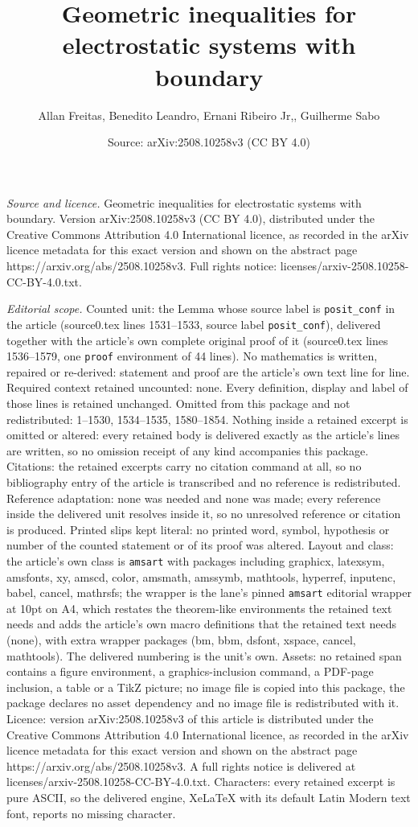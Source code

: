 \documentclass[10pt,a4paper]{amsart}
\title[Geometric inequalities for electrostatic systems with bounda]{Geometric inequalities for electrostatic systems with boundary}
\author{Allan Freitas, Benedito Leandro, Ernani Ribeiro Jr,, Guilherme Sabo}
\date{Source: arXiv:2508.10258v3 (CC BY 4.0)}
\begin{document}
\maketitle

\noindent\emph{Source and licence.} Geometric inequalities for electrostatic systems with boundary. Version arXiv:2508.10258v3 (CC BY 4.0), distributed under the Creative Commons Attribution 4.0 International licence, as recorded in the arXiv licence metadata for this exact version and shown on the abstract page https://arxiv.org/abs/2508.10258v3. Full rights notice: licenses/arxiv-2508.10258-CC-BY-4.0.txt.\par\smallskip

\noindent\textit{Editorial scope.} Counted unit: the Lemma whose source label is \texttt{posit\_conf} in the article (source0.tex lines 1531--1533, source label \texttt{posit\_conf}), delivered together with the article's own complete original proof of it (source0.tex lines 1536--1579, one \texttt{proof} environment of 44 lines). No mathematics is written, repaired or re-derived: statement and proof are the article's own text line for line. Required context retained uncounted: none. Every definition, display and label of those lines is retained unchanged. Omitted from this package and not redistributed: 1--1530, 1534--1535, 1580--1854. Nothing inside a retained excerpt is omitted or altered: every retained body is delivered exactly as the article's lines are written, so no omission receipt of any kind accompanies this package. Citations: the retained excerpts carry no citation command at all, so no bibliography entry of the article is transcribed and no reference is redistributed. Reference adaptation: none was needed and none was made; every reference inside the delivered unit resolves inside it, so no unresolved reference or citation is produced. Printed slips kept literal: no printed word, symbol, hypothesis or number of the counted statement or of its proof was altered. Layout and class: the article's own class is \texttt{amsart} with packages including graphicx, latexsym, amsfonts, xy, amscd, color, amsmath, amssymb, mathtools, hyperref, inputenc, babel, cancel, mathrsfs; the wrapper is the lane's pinned \texttt{amsart} editorial wrapper at 10pt on A4, which restates the theorem-like environments the retained text needs and adds the article's own macro definitions that the retained text needs (none), with extra wrapper packages (bm, bbm, dsfont, xspace, cancel, mathtools). The delivered numbering is the unit's own. Assets: no retained span contains a figure environment, a graphics-inclusion command, a PDF-page inclusion, a table or a TikZ picture; no image file is copied into this package, the package declares no asset dependency and no image file is redistributed with it. Licence: version arXiv:2508.10258v3 of this article is distributed under the Creative Commons Attribution 4.0 International licence, as recorded in the arXiv licence metadata for this exact version and shown on the abstract page https://arxiv.org/abs/2508.10258v3. A full rights notice is delivered at licenses/arxiv-2508.10258-CC-BY-4.0.txt. Characters: every retained excerpt is pure ASCII, so the delivered engine, XeLaTeX with its default Latin Modern text font, reports no missing character.
\end{document}
